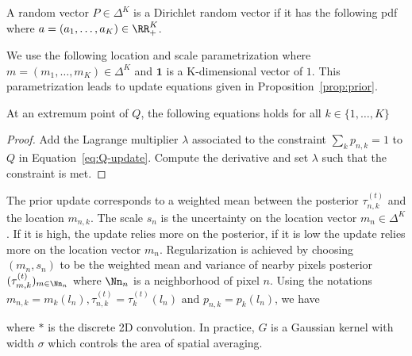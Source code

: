 \documentclass[a4paper,12pt]{article}
\begin{document}
\begin{defn}
\label{def:dirichlet}
A random vector $P\in\Delta^K$ is a Dirichlet random vector if it has the following pdf
where $a=(a_1,\dots,a_K) \in \RR_+^K$.
\end{defn}
We use the following location and scale parametrization 
where $m = (m_1,\dots,m_K) \in \Delta^K$ and $\mathbf{1}$ is a K-dimensional vector of $1$. This parametrization leads to update equations given in Proposition~\ref{prop:prior}.
\begin{prop}
\label{prop:prior}
At an extremum point of $Q$, the following equations holds for all $k\in \{1,\dots,K\}$ 
\end{prop}
\begin{proof}
Add the Lagrange multiplier $\lambda$ associated to the constraint $\sum_k p_{n,k}=1$ to $Q$ in Equation~\ref{eq:Q-update}. Compute the derivative and set $\lambda$ such that the constraint is met. %
\end{proof}
The prior update corresponds to a weighted mean between the posterior $\tau_{n,k}^{(t)}$ and the location $m_{n,k}$. The scale $s_n$ is the uncertainty on the location vector $m_{n} \in \Delta^K$. If it is high, the update relies more on the posterior, if it is low the update relies more on the location vector $m_n$. Regularization is achieved by choosing $(m_n,s_n)$ to be the weighted mean and variance of nearby pixels posterior $(\tau_{m,k}^{(t)})_{m \in \Nn_n}$ where $\Nn_n$ is a neighborhood of pixel $n$. Using the notations $m_{n,k} = m_k(l_n), \tau_{n,k}^{(t)} = \tau_k^{(t)}(l_n) \text{ and } p_{n,k} = p_k(l_n)$, we have

\begin{minipage}{0.3\linewidth}
\end{minipage}
\hspace{1mm}
\begin{minipage}{0.65\linewidth}
\end{minipage}
where $\ast$ is the discrete 2D convolution. In practice, $G$ is a Gaussian kernel with width $\sigma$ which controls the area of spatial averaging.
\end{document}
